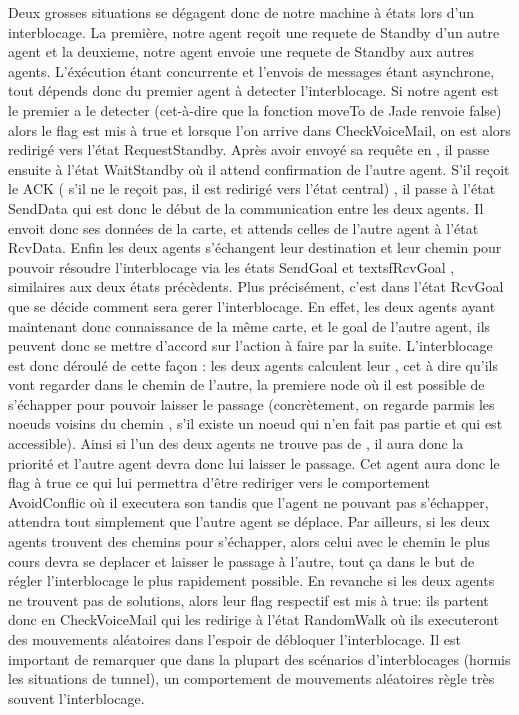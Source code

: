 \documentclass[11pt]{article}
\begin{document}
Deux grosses situations se dégagent donc de notre machine à états lors d'un interblocage. La première, notre agent reçoit une requete de Standby d'un autre agent et la deuxieme, notre agent envoie une requete de Standby aux autres agents. L'éxécution étant concurrente et l'envois de messages étant asynchrone, tout dépends donc du premier agent à detecter l'interblocage. Si notre agent est le premier a le detecter (cet-à-dire que la fonction moveTo de Jade renvoie false) alors le flag  est mis à true et lorsque l'on arrive dans \textsf{CheckVoiceMail}, on est alors redirigé vers l'état \textsf{RequestStandby}. Après avoir envoyé sa requête en , il passe ensuite à l'état \textsf{WaitStandby} où il attend confirmation de l'autre agent. S'il reçoit le ACK ( s'il ne le reçoit pas, il est redirigé vers l'état central) , il passe à l'état \textsf{SendData} qui est donc le début de la communication entre les deux agents. Il envoit donc ses données de la carte, et attends celles de l'autre agent à l'état \textsf{RcvData}. Enfin les deux agents s'échangent leur destination et leur chemin pour pouvoir résoudre l'interblocage via les états \textsf{SendGoal} et textsf{RcvGoal} , similaires aux deux états précèdents. Plus précisément, c'est dans l'état \textsf{RcvGoal} que se décide comment sera gerer l'interblocage. En effet, les deux agents ayant maintenant donc connaissance de la même carte, et le goal de l'autre agent, ils peuvent donc se mettre d'accord sur l'action à faire par la suite. L'interblocage est donc déroulé de cette façon : les deux agents calculent leur , cet à dire qu'ils vont regarder dans le chemin de l'autre, la premiere node où il est possible de s'échapper pour pouvoir laisser le passage (concrètement, on regarde parmis les noeuds voisins du chemin , s'il existe un noeud qui n'en fait pas partie et qui est accessible). Ainsi si l'un des deux agents ne trouve pas de , il aura donc la priorité et l'autre agent devra donc lui laisser le passage. Cet agent aura donc le flag  à true ce qui lui permettra d'être rediriger vers le comportement \textsf{AvoidConflic} où il executera son  tandis que l'agent ne pouvant pas s'échapper, attendra tout simplement que l'autre agent se déplace. Par ailleurs, si les deux agents trouvent des chemins pour s'échapper, alors celui avec le chemin le plus cours devra se deplacer et laisser le passage à l'autre, tout ça dans le but de régler l'interblocage le plus rapidement possible. En revanche si les deux agents ne trouvent pas de solutions, alors leur flag respectif  est mis à true: ils partent donc en \textsf{CheckVoiceMail} qui les redirige à l'état \textsf{RandomWalk} où ils executeront des mouvements aléatoires dans l'espoir de débloquer l'interblocage. Il est important de remarquer que dans la plupart des scénarios d'interblocages (hormis les situations de tunnel), un comportement de mouvements aléatoires règle très souvent l'interblocage.
\end{document}
